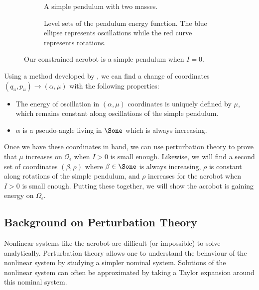 \begin{figure}
    \centering
    \begin{subfigure}[t]{0.45\textwidth}
        \caption{A simple pendulum with two masses.}
        \label{fig:acrobot-I0}
    \end{subfigure}
    \hfill
    \begin{subfigure}[t]{0.45\textwidth}
        \caption{Level sets of the pendulum energy function.
            The blue ellipse represents oscillations while the red curve
            represents rotations.}
        \label{fig:pendulum-level-sets}
    \end{subfigure}
    \caption{Our constrained acrobot is a simple pendulum when \(I = 0\).}
\end{figure}

Using a method developed by \citet{dynamic_vhcs_stabilize_closed_orbits},
we can find a change of coordinates \((q_u,p_u) \to (\alpha, \mu)\) with the
following properties:
\begin{itemize}
    \item The energy of oscillation in \((\alpha,\mu)\) coordinates is 
        uniquely defined by \(\mu\), which remains constant along oscillations
        of the simple pendulum.
    \item \(\alpha\) is a pseudo-angle living in \(\Sone\) which is
        always increasing.
\end{itemize}
Once we have these coordinates in hand, we can use perturbation theory to prove
that \(\mu\) increases on \(\mathcal{O}_\epsilon\) when \(I > 0\) is small enough.
Likewise, we will find a second set of coordinates \((\beta, \rho)\) where
\(\beta \in \Sone\) is always increasing, \(\rho\) is constant along
rotations of the simple pendulum, and \(\rho\) increases for the acrobot when
\(I > 0\) is small enough.
Putting these together, we will show the acrobot is gaining energy on
\(\Omega_\epsilon\).

\subsection*{Background on Perturbation Theory}
Nonlinear systems like the acrobot are difficult (or impossible) to solve
analytically.
Perturbation theory allows one to understand the behaviour of the nonlinear system
by studying a simpler nominal system. 
Solutions of the nonlinear system can often be approximated by taking a Taylor
expansion around this nominal system.

